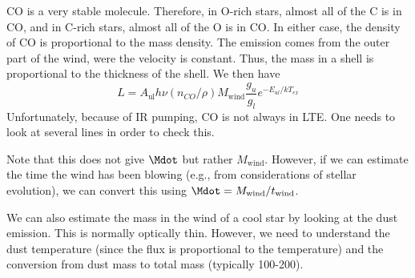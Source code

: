 CO is a very stable molecule. Therefore, in O-rich stars, almost all of the C is in CO, and in C-rich stars, almost all of the O is in CO. In either case, the density of CO is proportional to the mass density. The emission comes from the outer part of the wind, were the velocity is constant. Thus, the mass in a shell is proportional to the thickness of the shell. We then have
$$
L = A_\mathrm{ul} h\nu (n_{CO}/\rho) M_\mathrm{wind} \frac{g_u}{g_l}e^{-E_{ul}/kT_{ex}}
$$
Unfortunately, because of IR pumping, CO is not always in LTE. One needs to look at several lines in order to check this.

Note that this does not give $\Mdot$ but rather $M_\mathrm{wind}$. However, if we can estimate the time the wind has been blowing (e.g., from considerations of stellar evolution), we can convert this using $\Mdot = M_\mathrm{wind}/t_\mathrm{wind}$.

We can also estimate the mass in the wind of a cool star by looking at the dust emission. This is normally optically thin. However, we need to understand the dust temperature (since the flux is proportional to the temperature) and the conversion from dust mass to total mass (typically 100-200).
